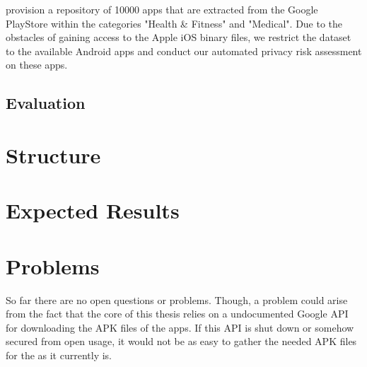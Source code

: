 \documentclass[
	a4paper,
	oneside,
	12pt,
	liststotocnumbered
]{article}
\let\cite\textcite
\begin{document}
\cite{Xu2015} provision a repository of 10000 apps that are extracted from the Google PlayStore within the categories "Health \& Fitness" and "Medical".
Due to the obstacles of gaining access to the Apple iOS binary files, we restrict the dataset to the available Android apps and conduct our automated privacy risk assessment on these apps.

\subsection{Evaluation}

\section{Structure}

\section{Expected Results}

\section{Problems}
So far there are no open questions or problems. Though, a problem could arise from the fact that the core of this thesis relies on a undocumented Google \acs{API} for downloading the \acs{APK} files of the apps. 
If this \acs{API} is shut down or somehow secured from open usage, it would not be as easy to gather the needed \acs{APK} files for the \sca as it currently is.

\newpage
\printbibliography[title={References}]
\end{document}
